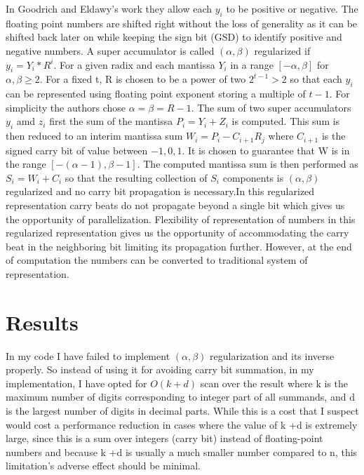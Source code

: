\documentclass[11pt]{article}       %
\begin{document}
In Goodrich and Eldawy's work they allow each $y_i$ to be positive or negative. The floating point numbers are shifted right without the loss of generality as it can be shifted back later on while keeping the sign bit (GSD) to identify positive and negative numbers. A super accumulator is called $(\alpha,\beta)$ regularized if $y_i = Y_i * R^i$. For a given radix and each mantissa $Y_i$ in a range $[-\alpha, \beta]$ for $\alpha, \beta \geq 2$. For a fixed t, R is chosen to be a power of two $2^{t-1} > 2$ so that each $y_i$ can be represented using floating point exponent storing a multiple of $t-1$. For simplicity the authors chose $\alpha = \beta = R-1$. The sum of two super accumulators $y_i$ amd $z_i$ first the sum of the mantissa $P_i = Y_i + Z_i$ is computed. This sum is then reduced to an interim mantissa sum $W_i = P_i - C_{i+1}R_j$ where $C_{i+1}$ is the signed carry bit of value between ${-1,0,1}$. It is chosen to guarantee that W is in the range $[-(\alpha-1), \beta-1]$. The computed mantissa sum is then performed as $S_i = W_i + C_i$ so that the resulting collection of $S_i$ components is $(\alpha,\beta)$ regularized and no carry bit propagation is necessary.In this regularized representation carry beats do not propagate beyond a single bit which gives us the opportunity of parallelization. Flexibility of representation of numbers in this regularized representation gives us the opportunity of accommodating the carry beat in the neighboring bit limiting its propagation further. However, at the end of computation the numbers can be converted to traditional system of representation.

\section{Results} \label{results}

In my code I have failed to implement $(\alpha, \beta)$ regularization and its inverse properly. So instead of using it for avoiding carry bit summation, in my implementation, I have opted for $O(k+d)$ scan over the result where k is the maximum number of digits corresponding to integer part of all summands, and d is the largest number of digits in decimal parts. While this is a cost that I suspect would cost a performance reduction in cases where the value of k +d is extremely large, since this is a sum over integers (carry bit) instead of floating-point numbers and because k +d is usually a much smaller number compared to n, this limitation's adverse effect should be minimal.
\end{document}
